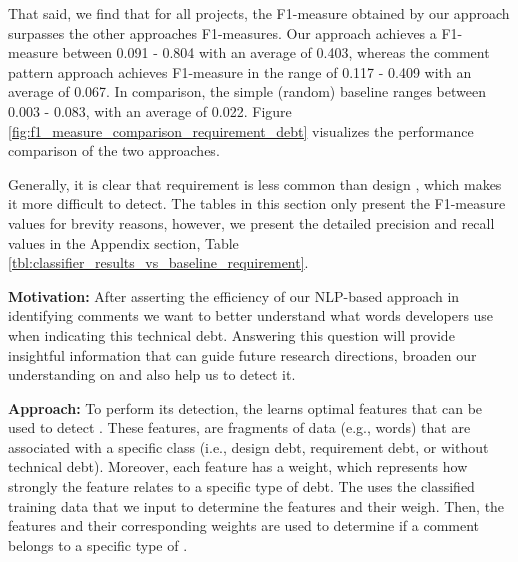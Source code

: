 That said, we find that for all projects, the F1-measure obtained by our approach surpasses the other approaches F1-measures. Our approach achieves a F1-measure between 0.091 - 0.804 with an average of 0.403, whereas the comment pattern approach achieves F1-measure in the range of 0.117 - 0.409 with an average of 0.067. In comparison, the simple (random) baseline ranges between 0.003 - 0.083, with an average of 0.022. Figure \ref{fig:f1_measure_comparison_requirement_debt} visualizes the performance comparison of the two approaches.

Generally, it is clear that requirement \SATD is less common than design \SATD, which makes it more difficult to detect. The tables in this section only present the F1-measure values for brevity reasons, however, we present the detailed precision and recall values in the Appendix section, Table \ref{tbl:classifier_results_vs_baseline_requirement}.


\vspace{3mm}
\noindent\rqii
\vspace{3mm}

\noindent \textbf{Motivation:} After asserting the efficiency of our NLP-based approach in identifying \SATD comments we want to better understand what words developers use when indicating this technical debt. Answering this question will provide insightful information that can guide future research directions, broaden our understanding on \SATD and also help us to detect it.     

\vspace{1mm}
\noindent \textbf{Approach:} To perform its detection, the  learns optimal features that can be used to detect \SATD. These features, are fragments of data (e.g., words) that are associated with a specific class (i.e., design debt, requirement debt, or without technical debt). Moreover, each feature has a weight, which represents how strongly the feature relates to a specific type of debt. The  uses the classified training data that we input to determine the features and their weigh. Then, the features and their corresponding weights are used to determine if a comment belongs to a specific type of \SATD.

